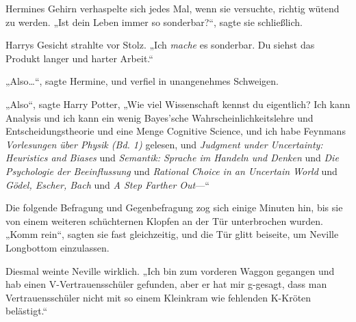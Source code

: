Hermines Gehirn verhaspelte sich jedes Mal, wenn sie versuchte, richtig wütend zu werden. „Ist dein Leben immer so sonderbar?“, sagte sie schließlich.

Harrys Gesicht strahlte vor Stolz. „Ich \emph{mache} es sonderbar. Du siehst das Produkt langer und harter Arbeit.“

„Also…“, sagte Hermine, und verfiel in unangenehmes Schweigen.

„Also“, sagte Harry Potter, „Wie viel Wissenschaft kennst du eigentlich? Ich kann Analysis und ich kann ein wenig Bayes’sche Wahrscheinlichkeitslehre und Entscheidungstheorie und eine Menge Cognitive Science, und ich habe Feynmans \emph{Vorlesungen über Physik (Bd. 1)} gelesen, und \emph{Judgment under Uncertainty: Heuristics and Biases} und \emph{Semantik: Sprache im Handeln und Denken} und \emph{Die Psychologie der Beeinflussung} und \emph{Rational Choice in an Uncertain World} und \emph{Gödel, Escher, Bach} und \emph{A Step Farther Out}—“

Die folgende Befragung und Gegenbefragung zog sich einige Minuten hin, bis sie von einem weiteren schüchternen Klopfen an der Tür unterbrochen wurden. „Komm rein“, sagten sie fast gleichzeitig, und die Tür glitt beiseite, um Neville Longbottom einzulassen.

Diesmal weinte Neville wirklich. „Ich bin zum vorderen Waggon gegangen und hab einen V-Vertrauensschüler gefunden, aber er hat mir g-gesagt, dass man Vertrauensschüler nicht mit so einem Kleinkram wie fehlenden K-Kröten belästigt.“

